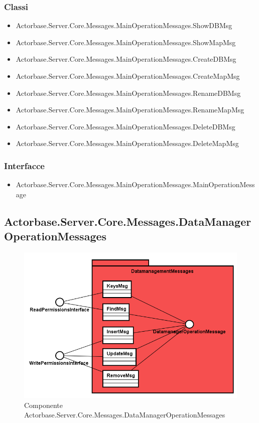 \documentclass[a4paper]{article}
\begin{document}
			\subsubsection{Classi}
			\begin{itemize}
				\item Actorbase.Server.Core.Messages.MainOperationMessages.ShowDBMsg
				\item Actorbase.Server.Core.Messages.MainOperationMessages.ShowMapMsg
				\item Actorbase.Server.Core.Messages.MainOperationMessages.CreateDBMsg
				\item Actorbase.Server.Core.Messages.MainOperationMessages.CreateMapMsg
				\item Actorbase.Server.Core.Messages.MainOperationMessages.RenameDBMsg
				\item Actorbase.Server.Core.Messages.MainOperationMessages.RenameMapMsg
				\item Actorbase.Server.Core.Messages.MainOperationMessages.DeleteDBMsg
				\item Actorbase.Server.Core.Messages.MainOperationMessages.DeleteMapMsg
			\end{itemize}
			\subsubsection{Interfacce}
			\begin{itemize}
				\item Actorbase.Server.Core.Messages.MainOperationMessages.MainOperationMessage
			\end{itemize}
			
		\subsection{Actorbase.Server.Core.Messages.DataManagerOperationMessages}
			\begin{figure} [H]
			\centering
			\includegraphics[scale=0.50]{Server/Package/DatamanagementMessagesLevel.png}
			\caption{Componente Actorbase.Server.Core.Messages.DataManagerOperationMessages}
			\end{figure}
\end{document}
